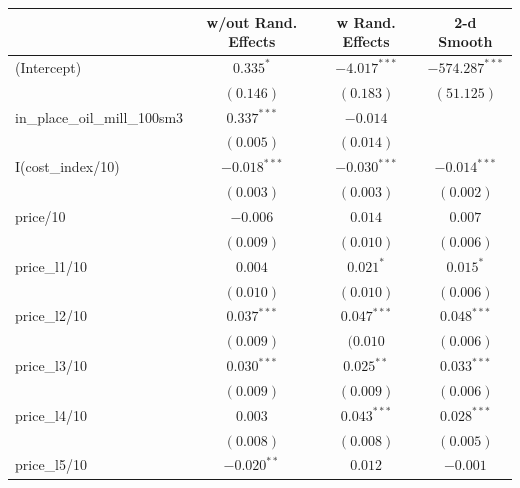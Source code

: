 \documentclass[11pt]{article}
\begin{document}
\begin{table}
\begin{center}
\begin{tabular}{l c c c }
\hline
                                             & w/out Rand. Effects & w Rand. Effects & 2-d Smooth \\
\hline
(Intercept)                                  & $0.335^{*}$    & $-4.017^{***}$ & $-574.287^{***}$ \\
                                             & $(0.146)$      & $(0.183)$      & $(51.125)$       \\
in\_place\_oil\_mill\_100sm3             & $0.337^{***}$  & $-0.014$       &                  \\
                                             & $(0.005)$      & $(0.014)$      &                  \\
I(cost\_index/10)                            & $-0.018^{***}$ & $-0.030^{***}$ & $-0.014^{***}$   \\
                                             & $(0.003)$      & $(0.003)$      & $(0.002)$        \\
price/10                                  & $-0.006$       & $0.014$        & $0.007$          \\
                                             & $(0.009)$      & $(0.010)$      & $(0.006)$        \\
price\_l1/10                              & $0.004$        & $0.021^{*}$    & $0.015^{*}$      \\
                                             & $(0.010)$      & $(0.010)$      & $(0.006)$        \\
price\_l2/10                              & $0.037^{***}$  & $0.047^{***}$  & $0.048^{***}$    \\
                                             & $(0.009)$      & $(0.010$      & $(0.006)$        \\
price\_l3/10                              & $0.030^{***}$  & $0.025^{**}$   & $0.033^{***}$    \\
                                             & $(0.009)$      & $(0.009)$      & $(0.006)$        \\
price\_l4/10                              & $0.003$        & $0.043^{***}$  & $0.028^{***}$    \\
                                             & $(0.008)$      & $(0.008)$      & $(0.005)$        \\
price\_l5/10                              & $-0.020^{**}$  & $0.012$        & $-0.001$         \\

\end{tabular}
\end{center}
\end{table}
\end{document}

